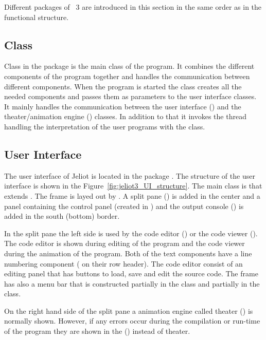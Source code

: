 Different packages of \jel{}~3 are introduced in this section in the same order as in the functional structure.

\subsection{Class \jel{} }
\label{sec:Jeliot_Class}

Class \jel{} in the package  is the main class of the program. It combines the different components of the program together and handles the communication between different components. When the program is started the class creates all the needed components and passes them as parameters to the user interface classes. It mainly handles the communication between the user interface () and the theater/animation engine () classes. In addition to that it invokes the thread handling the interpretation of the user programs with the  class.

\subsection{User Interface}
\label{sec:User_Interface}

The user interface of Jeliot is located in the package . The structure of the user interface is shown in the Figure~\ref{fig:jeliot3_UI_structure}. The main class is  that extends . The frame is layed out by . A split pane () is added in the center and a panel containing the control panel (created in ) and the output console () is added in the south (bottom) border.

In the split pane the left side is used by the code editor () or the code viewer (). The code editor is shown during editing of the program and the code viewer during the animation of the program. Both of the text components have a line numbering component ( on their row header). The code editor consist of an editing panel that has buttons to load, save and edit the source code. The frame has also a menu bar that is constructed partially in the  class and partially in the  class.

On the right hand side of the split pane a animation engine called theater () is normally shown. However, if any errors occur during the compilation or run-time of the program they are shown in the  () instead of theater.

